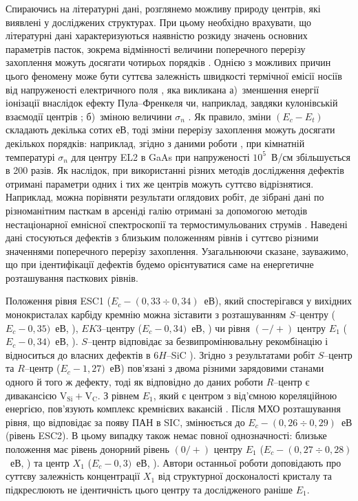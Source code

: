 \documentclass[a4paper,14pt,oneside,openany]{memoir}
\begin{document}
Спираючись на літературні дані, розглянемо можливу природу центрів,
які виявлені у досліджених структурах.
При цьому необхідно врахувати, що літературні дані характеризуються наявністю розкиду значень основних параметрів
пасток, зокрема відмінності величини поперечного перерізу захоплення можуть досягати чотирьох порядків \cite{Pavlovic2000}.
Однією з можливих причин цього феномену може бути суттєва залежність швидкості термічної емісії носіїв від
напруженості електричного поля  \cite{Bulyarskii2000r,Makram,Shishiyanu},
яка викликана
а)~зменшення енергії іонізації внаслідок ефекту Пула--Френкеля чи, наприклад,
завдяки кулонівській взаємодії центрів \cite{Stellmacher};
б)~зміною величини $\sigma_n$ \cite{Shishiyanu,Bourgoin2001}.
Як правило, зміни $(E_c-E_t)$ складають декілька сотих еВ, тоді
зміни перерізу захоплення можуть досягати декількох порядків:
наприклад, згідно з даними роботи \cite{Bourgoin2001},  при кімнатній температурі $\sigma_n$ для центру EL2 в GaAs при напруженості $10^5$~В/см збільшується в 200 разів.
Як наслідок, при використанні різних методів дослідження дефектів отримані параметри одних і тих же центрів
можуть суттєво відрізнятися.
Наприклад, можна порівняти результати оглядових робіт, де зібрані дані по різноманітним пасткам в арсеніді галію отримані за допомогою методів нестаціонарної емнісної спектроскопії \cite{Bourgoin:GaAs} та
термостимульованих струмів \cite{Pavlovic2000}.
Наведені дані стосуються дефектів з близьким положенням рівнів і суттєво різними значеннями поперечного перерізу захоплення.
Узагальнюючи сказане, зауважимо, що при ідентифікації дефектів будемо орієнтуватися саме на енергетичне розташування
пасткових рівнів.


Положення рівня ESC1 ($E_c-(0,33\div0,34)$~еВ), який спостерігався у вихідних монокристалах карбіду кремнію
можна зіставити з розташуванням $S$--центру ($E_c-0,35)$~еВ, \cite{Lebed1999,Anikin1991:2,Anikin1991:3}),
$EK3$--центру ($E_c-0,34)$~еВ, \cite{Kuznets1997}) чи рівня $(-/+)$ центру $E_1$ ($E_c-0,34)$~еВ, \cite{Lebed1999}).
$S$--центр відповідає за безвипромінювальну рекомбінацію і відноситься до власних дефектів в 6$H$--SiC \cite{Lebed1999}).
Згідно з результатами робіт \cite{Anikin1991:2,Anikin1991:3} $S$--центр та $R$--центр ($E_c-1,27)$~еВ) пов'язані
з двома різними зарядовими станами одного й того ж дефекту, тоді як відповідно до даних роботи \cite{Lebedev2000}
$R$--центр є дивакансією V$_\text{Si}+$V$_\text{C}$.
З рівнем $E_1$, який є центром з від'ємною кореляційною енергією,
пов'язують комплекс кремнієвих вакансій  \cite{Lebedev2001}.
Після МХО розташування рівня, що відповідає за появу ПАН в SIC, змінюється до $E_c-(0,26\div0,29)$~еВ (рівень ESC2).
В цьому випадку також немає повної однозначності:
близьке положення має рівень донорний рівень $(0/+)$ центру $E_1$ ($E_c-(0,27\div0,28)$~еВ, \cite{Hemmingsson})
та центр $X_1$ ($E_c-0,3)$~еВ, \cite{Lebedev2001}).
Автори останньої роботи доповідають про суттєву залежність концентрації $X_1$ від структурної
досконалості кристалу та підкреслюють не ідентичність цього центру  та  дослідженого раніше $E_1$.
\end{document}
